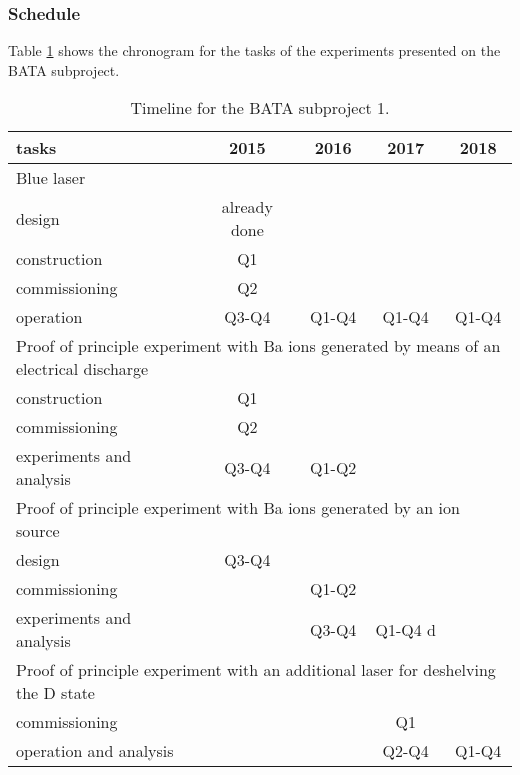 

\subsubsection*{Schedule}

Table \ref{tab:schedule_calibration} shows the chronogram for the tasks of the experiments presented on the  BATA subproject. 

\begin{table}
\begin{center}
\begin{tabular}{| l | c | c | c | c |}
\hline
tasks & 2015 & 2016 & 2017 & 2018 \\
\hline
\hline
\multicolumn{5}{|l|}{Blue laser}  \\
\hline
\hline
design & already done & & &  \\
construction & Q1 & & & \\
commissioning & Q2& & & \\
operation &  Q3-Q4 & Q1-Q4 &  Q1-Q4&  Q1-Q4\\
\hline
\hline
\multicolumn{5}{|l|}{Proof of principle experiment with Ba ions generated by means of an electrical discharge}  \\
\hline
\hline
construction  &  Q1 & & & \\
commissioning &  Q2 & & & \\
experiments and analysis &  Q3-Q4 & Q1-Q2& & \\
\hline
\hline
\multicolumn{5}{|l|}{Proof of principle experiment with Ba ions generated by an ion source}  \\
\hline
\hline
design & Q3-Q4 & & &  \\
commissioning  &  & Q1-Q2& & \\
experiments and analysis &  & Q3-Q4 & Q1-Q4 d& \\
\hline
\hline
\multicolumn{5}{|l|}{Proof of principle experiment with an additional laser for deshelving the D state}  \\
\hline
\hline
commissioning  &  &  & Q1 & \\
operation and analysis &  &  & Q2-Q4 & Q1-Q4 \\
\hline
\hline
\end{tabular}
\caption{Timeline for the BATA subproject 1.}
\label{tab:schedule_calibration}
\end{center}


\end{table}
